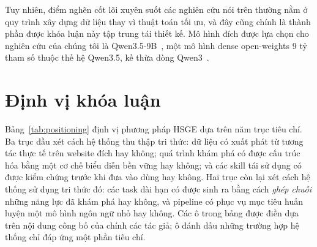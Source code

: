 Tuy nhiên, điểm nghẽn cốt lõi xuyên suốt các nghiên cứu nói trên thường nằm ở quy trình xây dựng dữ liệu thay vì thuật toán tối ưu, và đây cũng chính là thành phần được khóa luận này tập trung tái thiết kế. Mô hình đích được lựa chọn cho nghiên cứu của chúng tôi là Qwen3.5-9B~\cite{qwen2026qwen35}, một mô hình dense open-weights 9 tỷ tham số thuộc thế hệ Qwen3.5, kế thừa dòng Qwen3~\cite{yang2025qwen3}.

\section{Định vị khóa luận}
\label{sec:rel-positioning}

Bảng~\ref{tab:positioning} định vị phương pháp HSGE dựa trên năm trục tiêu chí.
Ba trục đầu xét cách hệ thống thu thập tri thức: dữ liệu có xuất phát từ tương tác
thực tế trên website đích hay không; quá trình khám phá có được
cấu trúc hóa bằng một cơ chế biểu diễn bền vững hay không; và các skill tái sử
dụng có được kiểm chứng trước khi đưa vào dùng hay không. Hai trục còn lại xét cách
hệ thống sử dụng tri thức đó: các task dài hạn có được sinh ra bằng cách
\emph{ghép chuỗi} những năng lực đã khám phá hay không, và pipeline có phục vụ mục
tiêu huấn luyện một mô hình ngôn ngữ nhỏ hay không. Các ô trong bảng được điền dựa
trên nội dung công bố của chính các tác giả; ô \LEFTcircle{} đánh dấu những trường
hợp hệ thống chỉ đáp ứng một phần tiêu chí.

